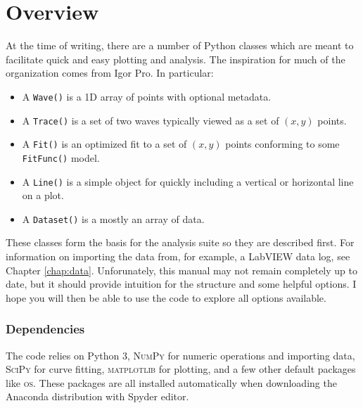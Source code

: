 \documentclass[10pt]{report}
\begin{document}
\setcounter{secnumdepth}{0}

\chapter{Overview}
At the time of writing, there are a number of Python classes which are meant to facilitate quick and easy plotting and analysis. The inspiration for much of the organization comes from Igor Pro. In particular:
\begin{itemize}
  \item A \texttt{Wave()} is a 1D array of points with optional metadata.
  \item A \texttt{Trace()} is a set of two waves typically viewed as a set of $(x, y)$ points.
  \item A \texttt{Fit()} is an optimized fit to a set of $(x, y)$ points conforming to some \texttt{FitFunc()} model.
  \item A \texttt{Line()} is a simple object for quickly including a vertical or horizontal line on a plot.
  \item A \texttt{Dataset()} is a mostly an array of data.
\end{itemize}
These classes form the basis for the analysis suite so they are described first. For information on importing the data from, for example, a LabVIEW data log, see Chapter \ref{chap:data}. Unforunately, this manual may not remain completely up to date, but it should provide intuition for the structure and some helpful options. I hope you will then be able to use the code to explore all options available.

\subsection*{Dependencies}
The code relies on Python 3, \textsc{NumPy} for numeric operations and importing data, \textsc{SciPy} for curve fitting, \textsc{matplotlib} for plotting, and a few other default packages like \textsc{os}. These packages are all installed automatically when downloading the Anaconda distribution with Spyder editor.
\end{document}
